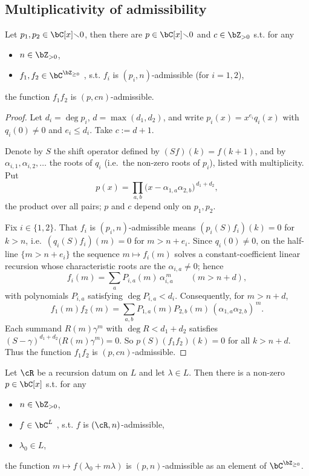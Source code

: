 \documentclass[12pt,a4paper]{amsart}%
\newcommand{\Rami}[1]{{{#1}}}
\newcommand{\RamiA}[1]{{{#1}}}
\newcommand{\RamiB}[1]{{{#1}}}
\newcommand{\RamiD}[1]{{{#1}}}
\begin{document}
\subsection{\Rami{Multiplicativity of admissibility}}\label{ssec:mult.adm}
 \begin{lemma}\label{lem:1d.prod}
     Let  $p_1,p_2 \in \C[x]\RamiD{\smallsetminus 0}$,
     then there are  $p \in \C[x]\RamiD{\smallsetminus 0}$ and $c\in\Z_{>0}$  s.t. for any
     \begin{itemize}
          \item
     $n\in \Z_{>0}$, \item $f_1,f_2\in \C^{\Z_{\geq 0}}$ , s.t. $f_i$ is $(p_i,n)$-admissible (for $i=1,2$),
          \end{itemize}
the function
     $f_1f_2$ is $(p,cn)$-admissible.
 \end{lemma}
  \begin{proof}
 Let $d_i=\deg p_i$, $d=\max(d_1,d_2)$, and write $p_i(x)=x^{e_i}q_i(x)$ with $q_i(0)\neq0$ and $e_i\leq d_i$. 
 \RamiB{Take $c:=d+1$.}
 
 Denote by $S$ the shift \RamiA{operator defined by} $(Sf)(k)=f(k+1)$, and by $\alpha_{i,1},\alpha_{i,2},\dots$ the roots of $q_i$ (i.e.\ the non-zero roots of $p_i$), listed with multiplicity. Put
 $$p(x)=\prod_{a,b}\bigl(x-\alpha_{1,a}\alpha_{2,b}\bigr)^{\,d_1+d_2},$$
 the product over all pairs; $p$ and $c$ depend only on $p_1,p_2$.

 Fix $i\in\{1,2\}$. That $f_i$ is $(p_i,n)$-admissible means $\RamiA{(p_i(S)f_i)}(k)=0$ for $k>n$, i.e.\ $\RamiA{(q_i(S)f_i)}(m)=0$ for $m>n+e_i$. Since $q_i(0)\neq0$, on the half-line $\{m>n+e_i\}$ the sequence $\RamiA{m\mapsto f_i(m)}$ solves a constant-coefficient linear recursion whose characteristic roots are the $\alpha_{i,a}\neq0$; hence
 $$f_i(m)=\sum_a P_{i,a}(m)\,\alpha_{i,a}^{\,m}\qquad(m>n+d),$$
 with \RamiA{polynomials $P_{i,a}$ satisfying} $\deg P_{i,a}<d_i$. 
 Consequently, for $m>n+d$,
 $$f_1(m)f_2(m)=\sum_{a,b}P_{1,a}(m)P_{2,b}(m)\,(\alpha_{1,a}\alpha_{2,b})^{\,m}.$$
 Each summand $R(m)\gamma^m$ with $\deg R<d_1+d_2$ satisfies $(S-\gamma)^{d_1+d_2}\bigl(R(m)\gamma^m\bigr)=0$. So $p(S)(f_1f_2)(k)=0$ for all $k>n+d$. 
 \RamiB{Thus} the function $f_1f_2$ is $(p,cn)$-admissible.
 \end{proof}
\begin{lemma}\label{lem:prop}
     Let  $\cR$ be a recursion datum on $L$ and let $\lambda\in L$.
     Then there is a non-zero $p\in \C[x]$  s.t. for any
     \begin{itemize}
          \item
     $n\in \Z_{>0}$,
     \item $f\in \C^{L}$ , s.t. $f$ is $(\cR,n)$-admissible,
     \item $\lambda_0\in L$,
          \end{itemize}
the function $m\mapsto f(\lambda_0+m\lambda)$ is
     $(p,n)$-admissible as an element of  $\C^{\Z_{\geq 0}}$.
\end{lemma}
\end{document}
